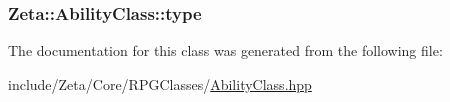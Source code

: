 \hypertarget{classZeta_1_1AbilityClass_a4ffb80485a1b4321c6c243d80dce1ed5}{
\subsubsection[{type}]{ Zeta\+::\+Ability\+Class\+::type\hspace{0.3cm}{\ttfamily [protected]}}}\label{classZeta_1_1AbilityClass_a4ffb80485a1b4321c6c243d80dce1ed5}


The documentation for this class was generated from the following file\+:\begin{DoxyCompactItemize}
\item 
include/\+Zeta/\+Core/\+R\+P\+G\+Classes/\hyperlink{AbilityClass_8hpp}{Ability\+Class.\+hpp}\end{DoxyCompactItemize}
